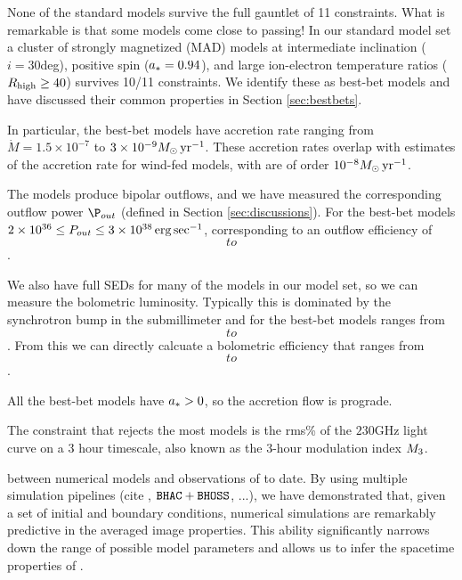 None of the standard models survive the full gauntlet of 11 constraints.  What is remarkable is that some models come close to passing!  In our standard model set a cluster of strongly magnetized (MAD) models at intermediate inclination ($i = 30$deg), positive spin ($a_* = 0.94$), and large  ion-electron temperature ratios ($R_\mathrm{high} \ge 40$) survives 10/11 constraints.  We identify these as best-bet models and have discussed their common properties in Section \ref{sec:bestbets}.

In particular, the best-bet models have accretion rate ranging from $\dot{M} = 1.5 \times 10^{-7}$ to $3 \times 10^{-9} M_\odot \,\mathrm{yr}^{-1}$.  These accretion rates overlap with estimates of the accretion rate for wind-fed models, with are of order $10^{-8} M_\odot\,\mathrm{yr}^{-1}$.  

The models produce bipolar outflows, and we have measured the corresponding outflow power $\P_{out}$ (defined in Section \ref{sec:discussions}).  For the best-bet models $2 \times 10^{36} \le P_{out} \le 3 \times 10^{38} \,\mathrm{erg} \,\mathrm{sec}^{-1}$, corresponding to an outflow efficiency of $$ to $$.  

We also have full SEDs for many of the models in our model set, so we can measure the bolometric luminosity.  Typically this is dominated by the synchrotron bump in the submillimeter and for the best-bet models ranges from $$ to $$.  From this we can directly calcuate a bolometric efficiency that ranges from $$ to $$.

All the best-bet models have $a_* > 0$, so the accretion flow is prograde.   

The constraint that rejects the most models is the rms\% of the $230$GHz light curve on a 3 hour timescale, also known as the 3-hour modulation index $M_{3}$.


between numerical models and observations of \sgra to date.
By using multiple simulation pipelines (cite \patoka, $\texttt{BHAC}+\texttt{BHOSS}$,
...), we have demonstrated that, given a set of initial and boundary
conditions, numerical simulations are remarkably predictive in the
averaged image properties.
This ability significantly narrows down the range of possible model
parameters and allows us to infer the spacetime properties of \sgra
{}.


